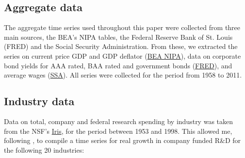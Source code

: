\documentclass{_latex/house}
\begin{document}
\subsection{Aggregate data} The aggregate time series used throughout this paper were collected from three main sources, the BEA's NIPA tables, the Federal Reserve Bank of St. Louis (FRED) and the Social Security Administration. From these, we extracted the series on current price GDP and GDP deflator (\href{http://www.bea.gov/itable}{BEA NIPA}), data on corporate bond yields for AAA rated, BAA rated and government bonds (\href{http://research.stlouisfed.org/fred2/categories/22}{FRED}), and average wages (\href{http://www.ssa.gov/OACT/cola/AWI.html}{SSA}). All series were collected for the period from 1958 to 2011.
\subsection{Industry data} Data on total, company and federal research spending by industry was taken from the NSF's \href{http://www.nsf.gov/statistics/iris/history_data.cfm}{Iris}, for the period between 1953 and 1998. This allowed me, following \cite{RePEc:tpr:restat:v:93:y:2011:i:2:p:542-553}, to compile a time series for real growth in company funded R\&D for the following 20 industries:
\end{document}
